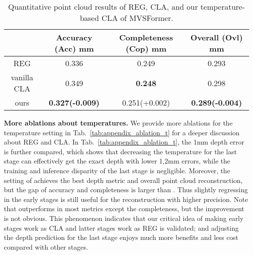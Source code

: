 \documentclass[10pt]{article} \usepackage[preprint]{tmlr}
\begin{document}
\begin{table}[h]
 \caption{Quantitative point cloud results of REG, CLA, and our temperature-based CLA of MVSFormer.
 \label{tab:quant_reg_cla2}}
 \small
 \centering
\begin{tabular}{cccc}
\toprule 
 & Accuracy (Acc) mm & Completeness (Cop) mm & Overall (Ovl) mm\tabularnewline
\midrule
REG & 0.336 & 0.249 & 0.293\tabularnewline
vanilla CLA & 0.349 & \textbf{0.248} & 0.298\tabularnewline
ours & \textbf{0.327(-0.009)} & 0.251(+0.002) & \textbf{0.289(-0.004)}\tabularnewline
\bottomrule
\end{tabular}
\end{table}

\noindent\textbf{More ablations about temperatures.}
We provide more ablations for the temperature setting in Tab.~\ref{tab:appendix_ablation_t} for a deeper discussion about REG and CLA. In Tab.~\ref{tab:appendix_ablation_t}, the 1mm depth error is further compared, which shows that decreasing the temperature for the last stage can effectively get the exact depth with lower 1,2mm errors, while the training and inference disparity of the last stage is negligible. Moreover, the setting of  achieves the best depth metric and overall point cloud reconstruction, but the gap of accuracy and completeness is larger than . Thus slightly regressing in the early stages is still useful for the reconstruction with higher precision. Note that  outperforms  in most metrics except the completeness, but the improvement is not obvious. This phenomenon indicates that our critical idea of making early stages work as CLA and latter stages work as REG is validated; and adjusting the depth prediction for the last stage enjoys much more benefits and less cost compared with other stages.
\end{document}

